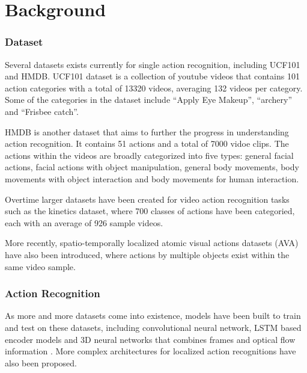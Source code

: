 \documentclass[
	a4paper, %
	10pt, %
	unnumberedsections, %
	twoside, %
]{t0004}
\begin{document}
\section{Background}

\subsubsection{Dataset} Several datasets exists currently for single action recognition, including UCF101\cite{Soomro:2012qr} and HMDB\cite{Kuehne11}. UCF101 dataset is a collection of youtube videos that contains 101 action categories with a total of 13320 videos, averaging 132 videos per category. Some of the categories in the dataset include ``Apply Eye Makeup'', ``archery'' and ``Frisbee catch''.

HMDB\cite{Kuehne11} is another dataset that aims to further the progress in understanding action recognition.  It contains 51 actions and a total of 7000 vidoe clips. The actions within the videos are broadly categorized into five types: general facial actions, facial actions with object manipulation, general body movements, body movements with object interaction and body movements for human interaction.

Overtime larger datasets have been created for video action recognition tasks such as the kinetics dataset\cite{Smaira:2020qr}, where 700 classes of actions have been categoried, each with an average of 926 sample videos.

More recently, spatio-temporally localized atomic visual actions datasets (AVA)\cite{Gu:2018qr} have also been introduced, where actions by multiple objects exist within the same video sample.

\subsubsection{Action Recognition} As more and more datasets come into existence, models have been built to train and test on these datasets, including convolutional neural network, LSTM\cite{Carreira:2018qr} based encoder models and 3D neural networks that combines frames and optical flow information \cite{Carreira:2018qr}. More complex architectures for localized action recognitions have also been proposed\cite{Wu:2023qr}.
\end{document}
